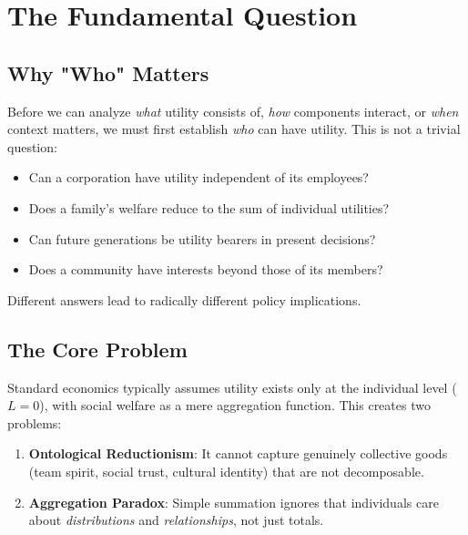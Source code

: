 \section{The Fundamental Question}
\label{sec:who-fundamental}

\subsection{Why "Who" Matters}

Before we can analyze \textit{what} utility consists of, \textit{how} components interact,
or \textit{when} context matters, we must first establish \textit{who} can have utility.
This is not a trivial question:

\begin{itemize}
\item Can a corporation have utility independent of its employees?
\item Does a family's welfare reduce to the sum of individual utilities?
\item Can future generations be utility bearers in present decisions?
\item Does a community have interests beyond those of its members?
\end{itemize}

Different answers lead to radically different policy implications.

\subsection{The Core Problem}

Standard economics typically assumes utility exists only at the individual level ($L=0$),
with social welfare as a mere aggregation function. This creates two problems:

\begin{enumerate}
\item \textbf{Ontological Reductionism}: It cannot capture genuinely collective goods
      (team spirit, social trust, cultural identity) that are not decomposable.
\item \textbf{Aggregation Paradox}: Simple summation ignores that individuals care
      about \textit{distributions} and \textit{relationships}, not just totals.
\end{enumerate}


